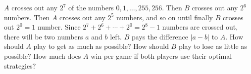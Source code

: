 $A$ crosses out any $2^7$ of the numbers $0, 1, \ldots, 255, 256$. Then $B$ crosses out any $2^6$ numbers. Then $A$ crosses out any $2^5$ numbers, and so on until finally $B$ crosses out $2^0 = 1$ number. Since $2^7 + 2^6 + \cdots + 2^0 = 2^8 - 1$ numbers are crossed out, there will be two numbers $a$ and $b$ left. $B$ pays the difference $|a - b|$ to $A$. How should $A$ play to get as much as possible? How should $B$ play to lose as little as possible? How much does $A$ win per game if both players use their optimal strategies?

